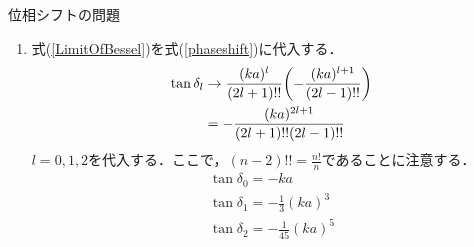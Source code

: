 \documentclass{report}
\begin{document}
\begin{myex}{位相シフトの問題}{}
\begin{enumerate}
            \begin{align}
              \e^{2\i \delta_l} h_l^{(1)} (ka) + h_l^{(2)}(ka) = 0 \\
              \e^{2\i \delta_l}\qty(j_l(ka) + \i n_l(ka)) + \qty(j_l(ka) - \i n_l(ka)) = 0 \\
              \qty(\e^{2\i \delta_l} + 1)j_l(ka) + \i\qty(\e^{2\i \delta_l} - 1)n_l(ka) = 0 \\
              2\cos\delta_l j_l(ka) -2 \sin\delta_l n_l(ka) = 0
            \end{align}
            となり，位相シフト
            \begin{align}
              \label{phaseshift}
              \tan\delta_l = \frac{j_l(ka)}{n_l(ka)}
            \end{align}
            が得られる．
      \item 式(\ref{LimitOfBessel})を式(\ref{phaseshift})に代入する．
            \begin{align}
              \tan\delta_l &\to \frac{(ka)^l}{(2l+1)!!} \qty(- \frac{(ka)^{l+1}}{(2l -1)!!}) \\
              &= -\frac{(ka)^{2l+1}}{(2l+1)!!(2l-1)!!} \\
            \end{align}
            $l=0,1,2$を代入する．ここで，$(n-2)!!=\frac{n!}{n}$であることに注意する．
            \begin{align}
              \tan\delta_0 = -ka \\
              \tan\delta_1 = -\frac{1}{3}(ka)^3 \\
              \tan\delta_2 = -\frac{1}{45}(ka)^5
            \end{align}
    \end{enumerate}
  \end{myex}
\end{document}
